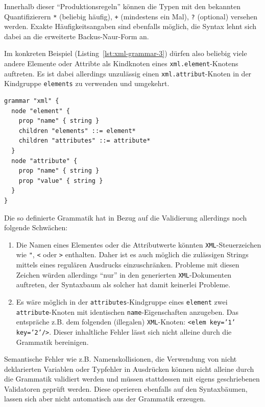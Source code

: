 \documentclass[paper=a4,fontsize=12pt,parskip=half]{scrartcl}
\begin{document}
Innerhalb dieser \enquote{Produktionsregeln} können die Typen mit den bekannten Quantifizierern \texttt{*} (beliebig häufig), \texttt{+} (mindestens ein Mal), \texttt{?} (optional) versehen werden. Exakte Häufigkeitsangaben sind ebenfalls möglich, die Syntax lehnt sich dabei an die erweiterte Backus-Naur-Form an.

Im konkreten Beispiel (Listing~\ref{lst:xml-grammar-3}) dürfen also beliebig viele andere Elemente oder Attribte als Kindknoten eines \texttt{xml.element}-Knotens auftreten. Es ist dabei allerdings unzulässig einen \texttt{xml.attribut}-Knoten in der Kindgruppe \texttt{elements} zu verwenden und umgekehrt.

\begin{lstlisting}[float=h, label={lst:xml-grammar-3},caption={\texttt{XML} Schritt 3 - Beziehungen zwischen Elementen und Attributen},captionpos=b,language={Grammar}]
grammar "xml" {
  node "element" {
    prop "name" { string }
    children "elements" ::= element*
    children "attributes" ::= attribute*
  }
  node "attribute" {
    prop "name" { string }
    prop "value" { string }
  }
}
\end{lstlisting}

Die so definierte Grammatik hat in Bezug auf die Validierung allerdings noch folgende Schwächen:

\begin{enumerate}
\item Die Namen eines Elementes oder die Attributwerte könnten \texttt{XML}-Steuerzeichen wie \texttt{"}, \texttt{<} oder \texttt{>} enthalten. Daher ist es auch möglich die zulässigen Strings mittels eines regulären Ausdrucks einzuschränken. Probleme mit diesen Zeichen würden allerdings \enquote{nur} in den generierten \texttt{XML}-Dokumenten auftreten, der Syntaxbaum als solcher hat damit keinerlei Probleme.
\item Es wäre möglich in der \texttt{attributes}-Kindgruppe eines \texttt{element} zwei \texttt{attribute}-Knoten mit identischen \texttt{name}-Eigenschaften anzugeben. Das entspräche z.B. dem folgenden (illegalen) \texttt{XML}-Knoten: \texttt{<elem key='1' key='2'/>}. Dieser inhaltliche Fehler lässt sich nicht alleine durch die Grammatik bereinigen.
\end{enumerate}

Semantische Fehler wie z.B. Namenskollisionen, die Verwendung von nicht deklarierten Variablen oder Typfehler in Ausdrücken können nicht alleine durch die Grammatik validiert werden und müssen stattdessen mit eigens geschriebenen Validatoren geprüft werden. Diese operieren ebenfalls auf den Syntaxbäumen, lassen sich aber nicht automatisch aus der Grammatik erzeugen.
\end{document}
